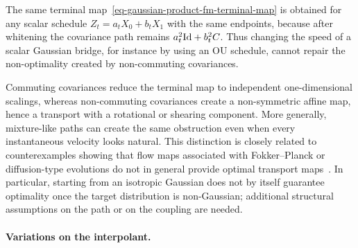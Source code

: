 \begin{rem}
	The same terminal map~\eqref{eq-gaussian-product-fm-terminal-map} is obtained for any scalar schedule $Z_t=a_tX_0+b_tX_1$ with the same endpoints, because after whitening the covariance path remains $a_t^2\mathrm{Id}+b_t^2C$. Thus changing the speed of a scalar Gaussian bridge, for instance by using an OU schedule, cannot repair the non-optimality created by non-commuting covariances.

	Commuting covariances reduce the terminal map to independent one-dimensional scalings, whereas non-commuting covariances create a non-symmetric affine map, hence a transport with a rotational or shearing component. More generally, mixture-like paths can create the same obstruction even when every instantaneous velocity looks natural. This distinction is closely related to counterexamples showing that flow maps associated with Fokker--Planck or diffusion-type evolutions do not in general provide optimal transport maps~\cite{LavenantSantambrogio2022FlowMap}. In particular, starting from an isotropic Gaussian does not by itself guarantee optimality once the target distribution is non-Gaussian; additional structural assumptions on the path or on the coupling are needed.
\end{rem}

\paragraph{Variations on the interpolant.}

